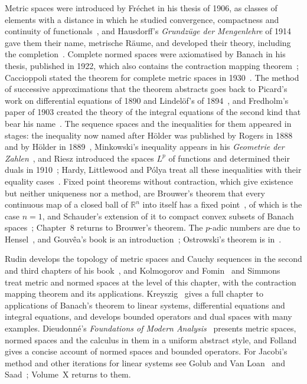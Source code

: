 Metric spaces were introduced by Fr\'echet in his thesis of 1906, as classes of elements with a distance in which he studied convergence, compactness and continuity of functionals~\cite{frechet1906}, and Hausdorff's \emph{Grundz\"uge der Mengenlehre} of 1914 gave them their name, metrische R\"aume, and developed their theory, including the completion~\cite{hausdorff1914}. Complete normed spaces were axiomatised by Banach in his thesis, published in 1922, which also contains the contraction mapping theorem~\cite{banach1922}; Caccioppoli stated the theorem for complete metric spaces in 1930~\cite{caccioppoli1930}. The method of successive approximations that the theorem abstracts goes back to Picard's work on differential equations of 1890 and Lindel\"of's of 1894~\cite{picard1890,lindelof1894}, and Fredholm's paper of 1903 created the theory of the integral equations of the second kind that bear his name~\cite{fredholm1903}. The sequence spaces and the inequalities for them appeared in stages: the inequality now named after H\"older was published by Rogers in 1888 and by H\"older in 1889~\cite{rogers1888,holder1889}, Minkowski's inequality appears in his \emph{Geometrie der Zahlen}~\cite{minkowski1896}, and Riesz introduced the spaces $L^p$ of functions and determined their duals in 1910~\cite{riesz1910}; Hardy, Littlewood and P\'olya treat all these inequalities with their equality cases~\cite{hardy1952inequalities}. Fixed point theorems without contraction, which give existence but neither uniqueness nor a method, are Brouwer's theorem that every continuous map of a closed ball of $\mathbb R^n$ into itself has a fixed point~\cite{brouwer1911}, of which  is the case $n=1$, and Schauder's extension of it to compact convex subsets of Banach spaces~\cite{schauder1930}; Chapter~8 returns to Brouwer's theorem. The $p$-adic numbers are due to Hensel~\cite{hensel1897}, and Gouv\^ea's book is an introduction~\cite{gouvea1997}; Ostrowski's theorem is in~\cite{ostrowski1916}.

Rudin develops the topology of metric spaces and Cauchy sequences in the second and third chapters of his book~\cite{rudin1976}, and Kolmogorov and Fomin~\cite{kolmogorov1975} and Simmons~\cite{simmons1963} treat metric and normed spaces at the level of this chapter, with the contraction mapping theorem and its applications. Kreyszig~\cite{kreyszig1978} gives a full chapter to applications of Banach's theorem to linear systems, differential equations and integral equations, and develops bounded operators and dual spaces with many examples. Dieudonn\'e's \emph{Foundations of Modern Analysis}~\cite{dieudonne1960} presents metric spaces, normed spaces and the calculus in them in a uniform abstract style, and Folland~\cite[Chap.~5]{folland1999} gives a concise account of normed spaces and bounded operators. For Jacobi's method and other iterations for linear systems see Golub and Van Loan~\cite[Sect.~11.2]{golub2013} and Saad~\cite{saad2003}; Volume~X returns to them.

\chapterreferences
